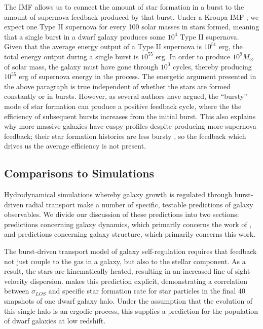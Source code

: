\documentclass[iop]{emulateapj}
\begin{document}
The IMF allows us to connect the amount of star formation in a burst to the amount of supernova feedback produced by that burst. Under a Kroupa IMF \citep{Kroupa02}, we expect one Type II supernova for every 100 solar masses in stars formed, meaning that a single burst in a dwarf galaxy produces some $10^4$ Type II supernova. Given that the average energy output of a Type II supernova is $10^{51}$ erg, the total energy output during a single burst is $10^{55}$ erg. In order to produce $10^9 M_{\odot}$ of solar mass, the galaxy must have gone through $10^3$ cycles, thereby producing $10^{55}$ erg of supernova energy in the process. The energetic argument presented in the above paragraph is true independent of whether the stars are formed constantly or in bursts. However, as several authors \citep{Governato12,GK13} have argued, the ``bursty'' mode of star formation can produce a positive feedback cycle, where the the efficiency of subsequent bursts increases from the initial burst. This also explains why more massive galaxies have cuspy profiles despite producing more supernova feedback; their star formation histories are less bursty \citep{Guo16}, so the feedback which drives us the average efficiency is not present.

\subsection{Comparisons to Simulations}

Hydrodynamical simulations whereby galaxy growth is regulated through burst-driven radial transport make a number of specific, testable predictions of galaxy observables. We divide our discussion of these predictions into two sections: predictions concerning galaxy dynamics, which primarily concerns the work of \cite{Cicone16}, and predictions concerning galaxy structure, which primarily concerns this work.

The burst-driven transport model of galaxy self-regulation requires that feedback not just couple to the gas in a galaxy, but also to the stellar component. As a result, the stars are kinematically heated, resulting in an increased line of sight velocity dispersion. \cite{El-Badry17} makes this prediction explicit, demonstrating a correlation between $\sigma_{LOS}$ and specific star formation rate for star particles in the final 40 snapshots of one dwarf galaxy halo. Under the assumption that the evolution of this single halo is an ergodic process, this supplies a prediction for the population of dwarf galaxies at low redshift.
\end{document}
